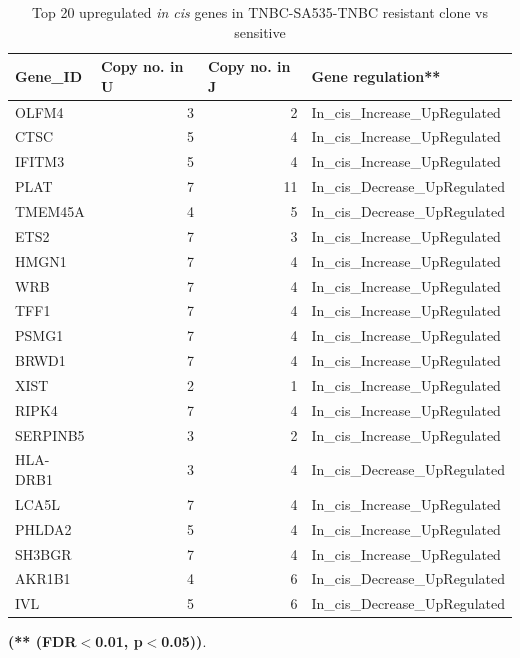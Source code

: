  \begin{table}[htbp]
   \centering
   \caption{Top 20 upregulated \textit{in cis} genes in TNBC-SA535-TNBC  resistant clone vs sensitive}
     \begin{tabular}{|l|r|r|l|}
     \hline
     \textbf{Gene\_ID} & \multicolumn{1}{|l|}{\textbf{Copy no. in  U} }& \multicolumn{1}{|l|}{\textbf{Copy no. in  J}} & \textbf{Gene regulation**} \\
     \hline
     OLFM4 & 3 & 2 & In\_cis\_Increase\_UpRegulated \\
     CTSC & 5 & 4 & In\_cis\_Increase\_UpRegulated \\
     IFITM3 & 5 & 4 & In\_cis\_Increase\_UpRegulated \\
     PLAT & 7 & 11 & In\_cis\_Decrease\_UpRegulated \\
     TMEM45A & 4 & 5 & In\_cis\_Decrease\_UpRegulated \\
     ETS2 & 7 & 3 & In\_cis\_Increase\_UpRegulated \\
     HMGN1 & 7 & 4 & In\_cis\_Increase\_UpRegulated \\
     WRB & 7 & 4 & In\_cis\_Increase\_UpRegulated \\
     TFF1 & 7 & 4 & In\_cis\_Increase\_UpRegulated \\
     PSMG1 & 7 & 4 & In\_cis\_Increase\_UpRegulated \\
     BRWD1 & 7 & 4 & In\_cis\_Increase\_UpRegulated \\
     XIST & 2 & 1 & In\_cis\_Increase\_UpRegulated \\
     RIPK4 & 7 & 4 & In\_cis\_Increase\_UpRegulated \\
     SERPINB5 & 3 & 2 & In\_cis\_Increase\_UpRegulated \\
     HLA-DRB1 & 3 & 4 & In\_cis\_Decrease\_UpRegulated \\
     LCA5L & 7 & 4 & In\_cis\_Increase\_UpRegulated \\
     PHLDA2 & 5 & 4 & In\_cis\_Increase\_UpRegulated \\
     SH3BGR & 7 & 4 & In\_cis\_Increase\_UpRegulated \\
     AKR1B1 & 4 & 6 & In\_cis\_Decrease\_UpRegulated \\
     IVL & 5 & 6 & In\_cis\_Decrease\_UpRegulated \\
     \hline
     \end{tabular}%
   \label{tab:top20SA535upregulatedCX}%
 
  \small\textbf{(** (FDR$<$0.01, p$<$0.05))}.

 \end{table}%






